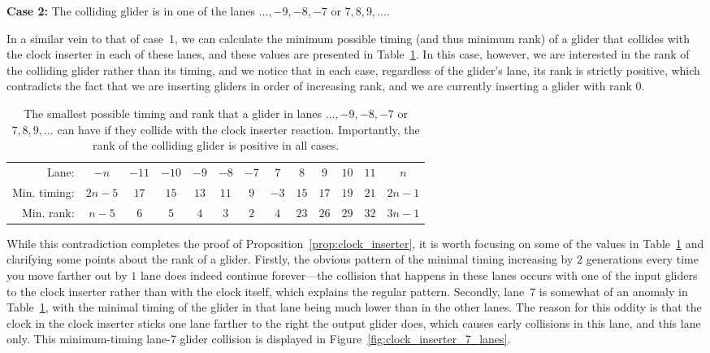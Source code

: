\noindent \textbf{Case 2:} The colliding glider is in one of the lanes $\ldots, -9, -8, -7$ or $7, 8, 9, \ldots$.

In a similar vein to that of case~1, we can calculate the minimum possible timing (and thus minimum rank) of a glider that collides with the clock inserter in each of these lanes, and these values are presented in Table~\ref{tab:clock_inserter_ranks_b}. In this case, however, we are interested in the rank of the colliding glider rather than its timing, and we notice that in each case, regardless of the glider's lane, its rank is strictly positive, which contradicts the fact that we are inserting gliders in order of increasing rank, and we are currently inserting a glider with rank $0$.

\begin{table}[!htb]\vspace*{0.05in}
	\begin{center}		
		\begin{tabular}{r c c c c c c | c c c c c c}
			\toprule
			Lane: & $-n$ & $-11$ & $-10$ & $-9$ & $-8$ & $-7$ & $7$ & $8$ & $9$ & $10$ & $11$ & $n$ \\
			Min. timing: & $2n-5$ & $17$ & $15$ & $13$ & $11$ & $9$ & $-3$ & $15$ & $17$ & $19$ & $21$ & $2n-1$ \\
			\rowcolor{gray!20} Min. rank: & $n-5$ & $6$ & $5$ & $4$ & $3$ & $2$ & $4$ & $23$ & $26$ & $29$ & $32$ & $3n-1$ \\\bottomrule
		\end{tabular}
		\caption{The smallest possible timing and rank that a glider in lanes $\ldots, -9, -8, -7$ or $7, 8, 9, \ldots$ can have if they collide with the clock inserter reaction. Importantly, the rank of the colliding glider is positive in all cases.}\label{tab:clock_inserter_ranks_b}
	\end{center}
\end{table}

While this contradiction completes the proof of Proposition~\ref{prop:clock_inserter}, it is worth focusing on some of the values in Table~\ref{tab:clock_inserter_ranks_b} and clarifying some points about the rank of a glider. Firstly, the obvious pattern of the minimal timing increasing by $2$ generations every time you move farther out by $1$ lane does indeed continue forever---the collision that happens in these lanes occurs with one of the input gliders to the clock inserter rather than with the clock itself, which explains the regular pattern. Secondly, lane~7 is somewhat of an anomaly in Table~\ref{tab:clock_inserter_ranks_b}, with the minimal timing of the glider in that lane being much lower than in the other lanes. The reason for this oddity is that the clock in the clock inserter sticks one lane farther to the right the output glider does, which causes early collisions in this lane, and this lane only. This minimum-timing lane-7 glider collision is displayed in Figure~\ref{fig:clock_inserter_7_lanes}.

